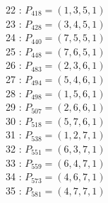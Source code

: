 \documentclass{article}
\begin{document}
{\begin{multicols}{2}
22 : $P_{418}=( 1, 3, 5, 1 )$\\
23 : $P_{428}=( 3, 4, 5, 1 )$\\
24 : $P_{440}=( 7, 5, 5, 1 )$\\
25 : $P_{448}=( 7, 6, 5, 1 )$\\
26 : $P_{483}=( 2, 3, 6, 1 )$\\
27 : $P_{494}=( 5, 4, 6, 1 )$\\
28 : $P_{498}=( 1, 5, 6, 1 )$\\
29 : $P_{507}=( 2, 6, 6, 1 )$\\
30 : $P_{518}=( 5, 7, 6, 1 )$\\
31 : $P_{538}=( 1, 2, 7, 1 )$\\
32 : $P_{551}=( 6, 3, 7, 1 )$\\
33 : $P_{559}=( 6, 4, 7, 1 )$\\
34 : $P_{573}=( 4, 6, 7, 1 )$\\
35 : $P_{581}=( 4, 7, 7, 1 )$\\
\end{multicols}
}
\end{document}
